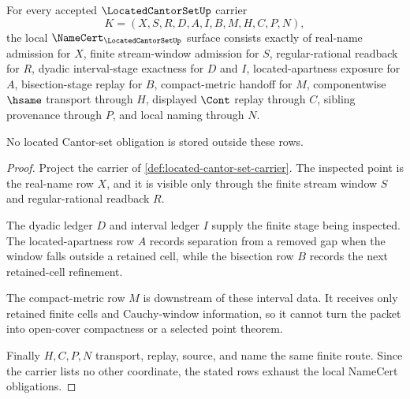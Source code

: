 \begin{theorem}
\label{thm:located-cantor-set-namecert-obligations}
For every accepted $\LocatedCantorSetUp$ carrier
$$
K=(X,S,R,D,A,I,B,M,H,C,P,N),
$$
the local $\NameCert_{\LocatedCantorSetUp}$ surface consists exactly of real-name admission for $X$, finite stream-window admission for $S$, regular-rational readback for $R$, dyadic interval-stage exactness for $D$ and $I$, located-apartness exposure for $A$, bisection-stage replay for $B$, compact-metric handoff for $M$, componentwise $\hsame$ transport through $H$, displayed $\Cont$ replay through $C$, sibling provenance through $P$, and local naming through $N$.

No located Cantor-set obligation is stored outside these rows.
\end{theorem}
\begin{proof}
Project the carrier of \autoref{def:located-cantor-set-carrier}. The inspected point is the real-name row $X$, and it is visible only through the finite stream window $S$ and regular-rational readback $R$.

The dyadic ledger $D$ and interval ledger $I$ supply the finite stage being inspected. The located-apartness row $A$ records separation from a removed gap when the window falls outside a retained cell, while the bisection row $B$ records the next retained-cell refinement.

The compact-metric row $M$ is downstream of these interval data. It receives only retained finite cells and Cauchy-window information, so it cannot turn the packet into open-cover compactness or a selected point theorem.

Finally $H,C,P,N$ transport, replay, source, and name the same finite route. Since the carrier lists no other coordinate, the stated rows exhaust the local NameCert obligations.
\end{proof}

